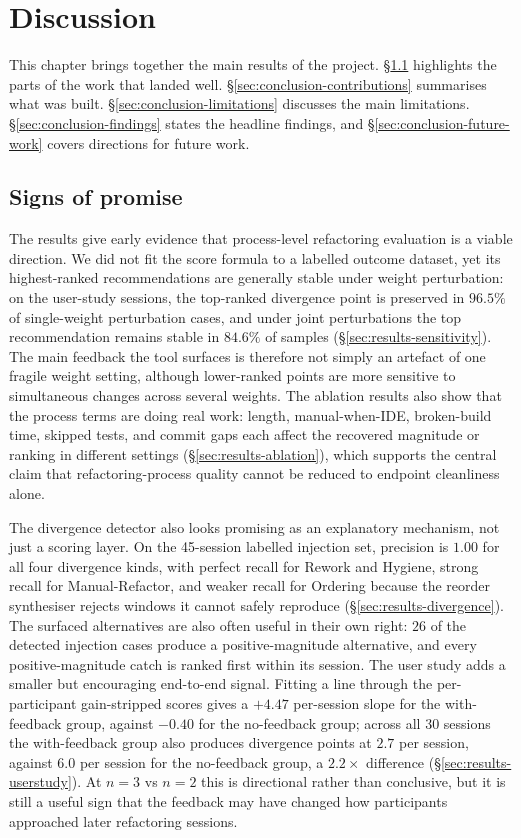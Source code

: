 \chapter{Discussion}
\label{ch:conclusion}

This chapter brings together the main results of the project. \S\ref{sec:conclusion-promise} highlights the parts of the work that landed well. \S\ref{sec:conclusion-contributions} summarises what was built. \S\ref{sec:conclusion-limitations} discusses the main limitations. \S\ref{sec:conclusion-findings} states the headline findings, and \S\ref{sec:conclusion-future-work} covers directions for future work.

\section{Signs of promise}
\label{sec:conclusion-promise}

The results give early evidence that process-level refactoring evaluation is a viable direction. We did not fit the score formula to a labelled outcome dataset, yet its highest-ranked recommendations are generally stable under weight perturbation: on the user-study sessions, the top-ranked divergence point is preserved in $96.5\%$ of single-weight perturbation cases, and under joint perturbations the top recommendation remains stable in $84.6\%$ of samples (\S\ref{sec:results-sensitivity}). The main feedback the tool surfaces is therefore not simply an artefact of one fragile weight setting, although lower-ranked points are more sensitive to simultaneous changes across several weights. The ablation results also show that the process terms are doing real work: length, manual-when-IDE, broken-build time, skipped tests, and commit gaps each affect the recovered magnitude or ranking in different settings (\S\ref{sec:results-ablation}), which supports the central claim that refactoring-process quality cannot be reduced to endpoint cleanliness alone.

The divergence detector also looks promising as an explanatory mechanism, not just a scoring layer. On the 45-session labelled injection set, precision is $1.00$ for all four divergence kinds, with perfect recall for Rework and Hygiene, strong recall for Manual-Refactor, and weaker recall for Ordering because the reorder synthesiser rejects windows it cannot safely reproduce (\S\ref{sec:results-divergence}). The surfaced alternatives are also often useful in their own right: $26$ of the detected injection cases produce a positive-magnitude alternative, and every positive-magnitude catch is ranked first within its session. The user study adds a smaller but encouraging end-to-end signal. Fitting a line through the per-participant gain-stripped scores gives a $+4.47$ per-session slope for the with-feedback group, against $-0.40$ for the no-feedback group; across all $30$ sessions the with-feedback group also produces divergence points at $2.7$ per session, against $6.0$ per session for the no-feedback group, a $2.2\times$ difference (\S\ref{sec:results-userstudy}). At $n = 3$ vs $n = 2$ this is directional rather than conclusive, but it is still a useful sign that the feedback may have changed how participants approached later refactoring sessions.

